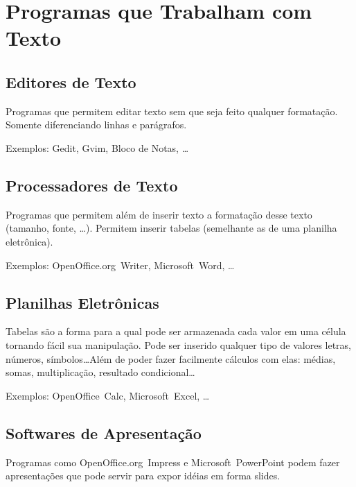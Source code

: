 \documentclass[12pt,a4]{book}
\begin{document}
\section{Programas que Trabalham com Texto}

\subsection{Editores de Texto}

Programas que permitem editar texto sem que seja feito qualquer formatação.
Somente diferenciando linhas e parágrafos.

Exemplos: Gedit, Gvim, Bloco de Notas, \ldots

\subsection{Processadores de Texto}

Programas que permitem além de inserir texto a formatação desse texto (tamanho,
fonte, \ldots). Permitem inserir tabelas (semelhante as de uma planilha
eletrônica).

Exemplos: \mbox{OpenOffice.org Writer}, \mbox{Microsoft Word}, \ldots

\subsection{Planilhas Eletrônicas}

Tabelas são a forma para a qual pode ser armazenada cada valor em uma célula
tornando fácil sua manipulação. Pode ser inserido qualquer tipo de valores
letras, números, símbolos\ldots Além de poder fazer facilmente cálculos com
elas: médias, somas, multiplicação, resultado condicional\ldots

Exemplos: \mbox{OpenOffice Calc}, \mbox{Microsoft Excel}, \ldots

\subsection{Softwares de Apresentação}

Programas como \mbox{OpenOffice.org Impress} e \mbox{Microsoft PowerPoint}
podem fazer apresentações que pode servir para expor idéias em forma slides.
\end{document}
